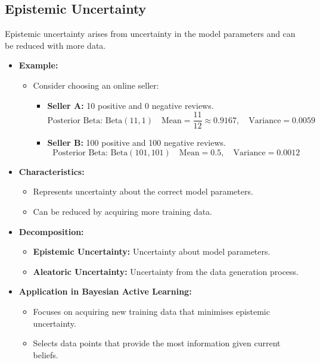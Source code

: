 \subsection{Epistemic Uncertainty}

Epistemic uncertainty arises from uncertainty in the model parameters and can be reduced with more data.

\begin{itemize}
    \item \textbf{Example:}
          \begin{itemize}
              \item Consider choosing an online seller:
                    \begin{itemize}
                        \item \textbf{Seller A:} 10 positive and 0 negative reviews.
                              \[
                                  \text{Posterior Beta: } \text{Beta}(11, 1) \quad \text{Mean} = \frac{11}{12} \approx 0.9167, \quad \text{Variance} = 0.0059
                              \]
                        \item \textbf{Seller B:} 100 positive and 100 negative reviews.
                              \[
                                  \text{Posterior Beta: } \text{Beta}(101, 101) \quad \text{Mean} = 0.5, \quad \text{Variance} = 0.0012
                              \]
                    \end{itemize}
          \end{itemize}
    \item \textbf{Characteristics:}
          \begin{itemize}
              \item Represents uncertainty about the correct model parameters.
              \item Can be reduced by acquiring more training data.
          \end{itemize}
    \item \textbf{Decomposition:}
          \begin{itemize}
              \item \textbf{Epistemic Uncertainty:} Uncertainty about model parameters.
              \item \textbf{Aleatoric Uncertainty:} Uncertainty from the data generation process.
          \end{itemize}
    \item \textbf{Application in Bayesian Active Learning:}
          \begin{itemize}
              \item Focuses on acquiring new training data that minimises epistemic uncertainty.
              \item Selects data points that provide the most information given current beliefs.
          \end{itemize}
\end{itemize}

